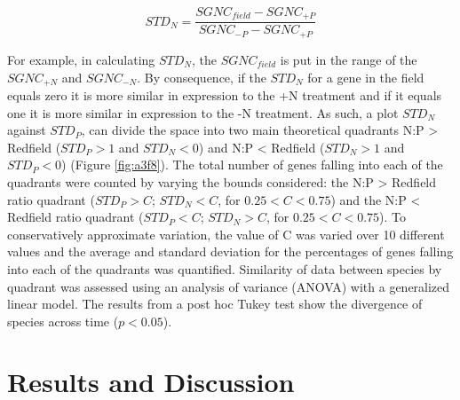 \begin{equation}
	\label{eq:STDP}
	STD_N = \frac{SGNC_{field} - SGNC_{+P}}{SGNC_{-P} - SGNC_{+P}} 	
\end{equation}

For example, in calculating $STD_N$, the $SGNC_{field}$ is put in the range of the $SGNC_{+N}$ and $SGNC_{-N}$. By consequence, if the $STD_N$ for a gene in the field equals zero it is more similar in expression to the +N treatment and if it equals one it is more similar in expression to the -N treatment. As such, a plot $STD_N$ against $STD_P$, can divide the space into two main theoretical quadrants N:P > Redfield ($STD_P > 1$ and $STD_N < 0$) and N:P < Redfield ($STD_N > 1$ and $STD_P < 0$) (Figure \ref{fig:a3f8}). The total number of genes falling into each of the quadrants were counted by varying the bounds considered: the N:P > Redfield ratio quadrant ($STD_P > C$; $STD_N < C$, for $0.25 < C < 0.75$) and the N:P < Redfield ratio quadrant ($STD_P < C$; $STD_N > C$, for $0.25 < C < 0.75$). To conservatively approximate variation, the value of C was varied over 10 different values and the average and standard deviation for the percentages of genes falling into each of the quadrants was quantified. Similarity of data between species by quadrant was assessed using an analysis of variance (ANOVA) with a generalized linear model. The results from a post hoc Tukey test show the divergence of species across time ($p < 0.05$).

\section{Results and Discussion}

